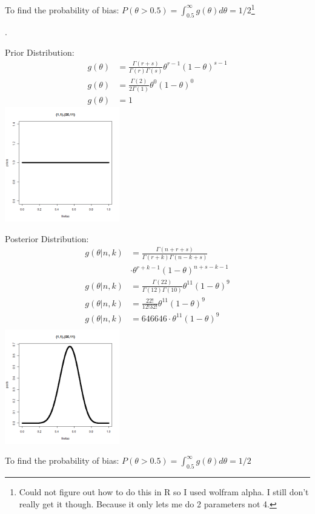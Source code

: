 \documentclass[12pt]{article}
\newenvironment{problem}[2][Problem]{\begin{trivlist}
\item[\hskip \labelsep {\bfseries #1}\hskip \labelsep {\bfseries #2.}]}{\end{trivlist}}
\begin{document}
\begin{problem}{(1,1),(4,3)}
To find the probability of bias: $P(\theta > 0.5) = \int_{0.5}^{\infty} g(\theta ) d\theta =  1/2$\footnote{Could not figure out how to do this in R so I used wolfram alpha. I still don't really get it though. Because it only lets me do 2 parameters not 4.} 

\end{problem}
\newpage

\begin{problem}{(1,1),(20,11)}.
\begin{multicols}{2}
 Prior Distribution: 
\begin{align*}
  g(\theta) &= \frac{\Gamma (r+s)}{\Gamma (r) \Gamma (s)} \theta^{r-1}(1-\theta)^{s-1} \\
    g(\theta) &= \frac{\Gamma (2)}{2\Gamma (1)} \theta^{0}(1-\theta)^{0} \\
    g(\theta) &= 1 
\end{align*}
\columnbreak
  \includegraphics[width=5cm]{112011_prior2.png}
 \label{fig:boat1}
\end{multicols}

\begin{multicols}{2}
Posterior Distribution: 
\begin{align*}
    g(\theta | n,k) &= \frac{\Gamma (n+r+s)}{\Gamma (r+k) \Gamma (n-k+s)} \\
    & \cdot \theta^{r+k-1}(1-\theta)^{n+s-k-1} \\
    g(\theta | n,k) &= \frac{\Gamma (22)}{\Gamma (12) \Gamma (10)} \theta^{11}(1-\theta)^{9} \\
    g(\theta | n,k) &= \frac{22!}{12!32!} \theta^{11}(1-\theta)^{9} \\
    g(\theta | n,k) &= 646646 \cdot \theta^{11}(1-\theta)^{9} \\
\end{align*}
\columnbreak
  \includegraphics[width=5cm]{112011_post.png}
 \label{fig:boat1}
\end{multicols}
To find the probability of bias: $P(\theta > 0.5) = \int_{0.5}^{\infty} g(\theta ) d\theta =  1/2$


\end{problem}
\end{document}
